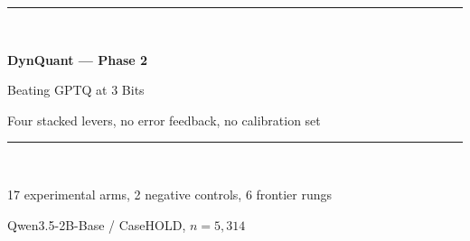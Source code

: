 \documentclass[11pt]{article}
\begin{document}
\begin{titlepage}
\centering
\vspace*{1.0in}
{\color{dqblue}\rule{\textwidth}{1.2pt}}\\[0.8em]
{\Huge\bfseries DynQuant --- Phase 2\par}
\vspace{0.5em}
{\LARGE Beating GPTQ at 3 Bits\par}
\vspace{0.35em}
{\large Four stacked levers, no error feedback, no calibration set\par}
\vspace{0.7em}
{\color{dqblue}\rule{\textwidth}{1.2pt}}\\[1.8em]
{\large 17 experimental arms, 2 negative controls, 6 frontier rungs\par}
\vspace{0.3em}
{\large Qwen3.5-2B-Base / CaseHOLD, $n = 5{,}314$\par}
\vspace{2.0em}


\end{titlepage}
\end{document}
